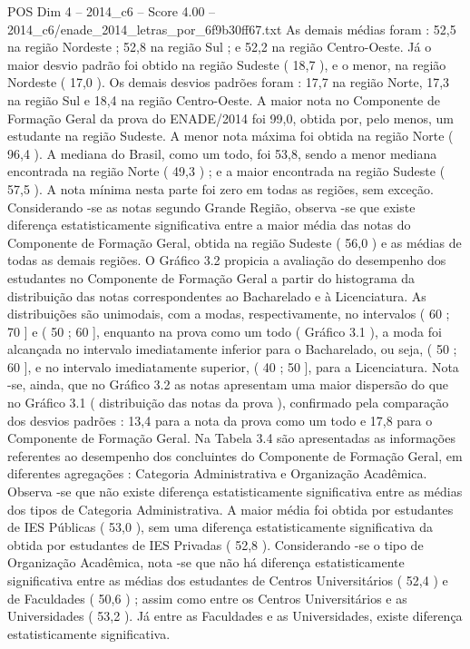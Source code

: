 \begin{textsample}{POS Dim 4 – 2014\_c6 – Score 4.00 – 2014\_c6/enade\_2014\_letras\_por\_6f9b30ff67.txt}
As demais médias foram : 52,5 na região Nordeste ; 52,8 na região Sul ; e 52,2 na região Centro-Oeste.
Já o maior desvio padrão foi obtido na região Sudeste ( 18,7 ), e o menor, na região Nordeste ( 17,0 ).
Os demais desvios padrões foram : 17,7 na região Norte, 17,3 na região Sul e 18,4 na região Centro-Oeste.
A maior nota no Componente de Formação Geral da prova do ENADE/2014 foi 99,0, obtida por, pelo menos, um estudante na região Sudeste.
A menor nota máxima foi obtida na região Norte ( 96,4 ).
A mediana do Brasil, como um todo, foi 53,8, sendo a menor mediana encontrada na região Norte ( 49,3 ) ; e a maior encontrada na região Sudeste ( 57,5 ).
A nota mínima nesta parte foi zero em todas as regiões, sem exceção.
Considerando -se as notas segundo Grande Região, observa -se que existe diferença estatisticamente significativa entre a maior média das notas do Componente de Formação Geral, obtida na região Sudeste ( 56,0 ) e as médias de todas as demais regiões.
O Gráfico 3.2 propicia a avaliação do desempenho dos estudantes no Componente de Formação Geral a partir do histograma da distribuição das notas correspondentes ao Bacharelado e à Licenciatura.
As distribuições são unimodais, com a modas, respectivamente, no intervalos ( 60 ; 70 ] e ( 50 ; 60 ], enquanto na prova como um todo ( Gráfico 3.1 ), a moda foi alcançada no intervalo imediatamente inferior para o Bacharelado, ou seja, ( 50 ; 60 ], e no intervalo imediatamente superior, ( 40 ; 50 ], para a Licenciatura.
Nota -se, ainda, que no Gráfico 3.2 as notas apresentam uma maior dispersão do que no Gráfico 3.1 ( distribuição das notas da prova ), confirmado pela comparação dos desvios padrões : 13,4 para a nota da prova como um todo e 17,8 para o Componente de Formação Geral.
Na Tabela 3.4 são apresentadas as informações referentes ao desempenho dos concluintes do Componente de Formação Geral, em diferentes agregações : Categoria Administrativa e Organização Acadêmica.
Observa -se que não existe diferença estatisticamente significativa entre as médias dos tipos de Categoria Administrativa.
A maior média foi obtida por estudantes de IES Públicas ( 53,0 ), sem uma diferença estatisticamente significativa da obtida por estudantes de IES Privadas ( 52,8 ).
Considerando -se o tipo de Organização Acadêmica, nota -se que não há diferença estatisticamente significativa entre as médias dos estudantes de Centros Universitários ( 52,4 ) e de Faculdades ( 50,6 ) ; assim como entre os Centros Universitários e as Universidades ( 53,2 ).
Já entre as Faculdades e as Universidades, existe diferença estatisticamente significativa.

\end{textsample}
